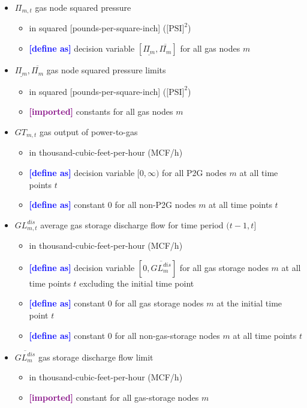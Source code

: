 \documentclass{article}
\newcommand{\lo}[1]{\underline{#1}}
\newcommand{\hi}[1]{\overline{#1}}
\newcommand{\define}{\textcolor{blue}{\textbf{[define as] }}}
\newcommand{\imported}{\textcolor{purple}{\textbf{[imported] }}}
\begin{document}
\begin{itemize}
\item $\Pi_{m,t}$ gas node squared pressure
  \begin{itemize}
  \item in squared [pounds-per-square-inch] ($\text{[PSI]}^2$)
  \item \define decision variable $[\lo{\Pi_m}, \hi{\Pi_m}]$ for all gas nodes
    $m$
  \end{itemize}

\item $\lo{\Pi_m}, \hi{\Pi_m}$ gas node squared pressure limits
  \begin{itemize}
  \item in squared [pounds-per-square-inch] ($\text{[PSI]}^2$)
  \item \imported constants for all gas nodes $m$
  \end{itemize}

\item $GT_{m,t}$ gas output of power-to-gas
  \begin{itemize}
  \item in thousand-cubic-feet-per-hour (MCF/h)
  \item \define decision variable $[0, \infty)$ for all P2G nodes $m$ at all
    time points $t$
  \item \define constant $0$ for all non-P2G nodes $m$ at all time points $t$
  \end{itemize}

\item $GL^{dis}_{m,t}$ average gas storage discharge flow for time period $(t-1,
  t]$
  \begin{itemize}
  \item in thousand-cubic-feet-per-hour (MCF/h)
  \item \define decision variable $[0, \hi{GL^{dis}_m}]$ for all gas storage
    nodes $m$ at all time points $t$ excluding the initial time point
  \item \define constant $0$ for all gas storage nodes $m$ at the initial time
    point $t$
  \item \define constant $0$ for all non-gas-storage nodes $m$ at all time
    points $t$
  \end{itemize}

\item $\hi{GL^{dis}_m}$ gas storage discharge flow limit
  \begin{itemize}
  \item in thousand-cubic-feet-per-hour (MCF/h)
  \item \imported constant for all gas-storage nodes $m$
  \end{itemize}


\end{itemize}
\end{document}
